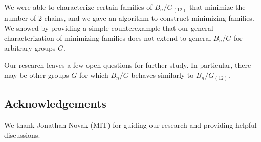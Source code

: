 \documentclass[12pt]{article}
\theoremstyle{plain}
\theoremstyle{definition}
\theoremstyle{remark}
\begin{document}
We were able to characterize certain families of $B_n / G_{(12)}$ that minimize the number of 2-chains, and we gave an algorithm to construct minimizing families. We showed by providing a simple counterexample that our general characterization of minimizing families does not extend to general $B_n / G$ for arbitrary groups $G$.

Our research leaves a few open questions for further study. In particular, there may be other groups $G$ for which $B_n / G$ behaves similarly to $B_n / G_{(12)}$. 

\subsection*{Acknowledgements}
We thank Jonathan Novak (MIT) for guiding our research and providing helpful discussions.

%  
%  

\begin{thebibliography}{10}

\end{thebibliography}
\end{document}
